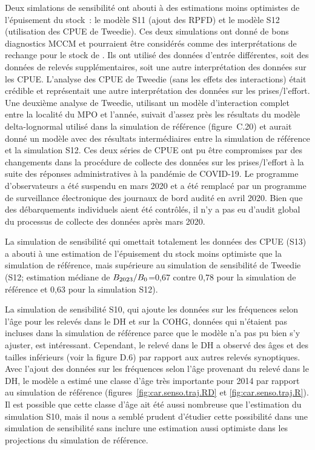 \documentclass[11pt]{book}
\begin{document}
Deux simlations de sensibilit\'{e} ont abouti \`{a} des estimations moins optimistes de l'\'{e}puisement du stock~: le mod\`{e}le S11 (ajout des RPFD) et le mod\`{e}le S12 (utilisation des CPUE de Tweedie). Ces deux simulations ont donn\'{e} de bons diagnostics MCCM et pourraient \^{e}tre consid\'{e}r\'{e}s comme des interpr\'{e}tations de rechange pour le stock de \SPC{}.
Ils ont utilis\'{e} des donn\'{e}es d'entr\'{e}e diff\'{e}rentes, soit des donn\'{e}es de relev\'{e}s suppl\'{e}mentaires, soit une autre interpr\'{e}tation des donn\'{e}es sur les CPUE.
L'analyse des CPUE de Tweedie (sans les effets des interactions) \'{e}tait cr\'{e}dible et repr\'{e}sentait une autre interpr\'{e}tation des donn\'{e}es sur les prises/l'effort. Une deuxi\`{e}me analyse de Tweedie, utilisant un mod\`{e}le d'interaction complet entre la localit\'{e} du MPO et l'ann\'{e}e, suivait d'assez pr\`{e}s les r\'{e}sultats du mod\`{e}le delta-lognormal utilis\'{e} dans la simulation de r\'{e}f\'{e}rence (figure~C.20) et aurait donn\'{e} un mod\`{e}le avec des r\'{e}sultats interm\'{e}diaires entre la simulation de r\'{e}f\'{e}rence et la simulation S12.
Ces deux s\'{e}ries de CPUE ont pu \^{e}tre compromises par des changements dans la proc\'{e}dure de collecte des donn\'{e}es sur les prises/l'effort \`{a} la suite des r\'{e}ponses administratives \`{a} la pand\'{e}mie de COVID-19.
Le programme d'observateurs a \'{e}t\'{e} suspendu en mars 2020 et a \'{e}t\'{e} remplac\'{e} par un programme de surveillance \'{e}lectronique des journaux de bord audit\'{e} en avril 2020. Bien que des d\'{e}barquements individuels aient \'{e}t\'{e} contr\^{o}l\'{e}s, il n'y a pas eu d'audit global du processus de collecte des donn\'{e}es apr\`{e}s mars 2020.

La simulation de sensibilit\'{e} qui omettait totalement les donn\'{e}es des CPUE (S13) a abouti \`{a} une estimation de l'\'{e}puisement du stock moins optimiste que la simulation de r\'{e}f\'{e}rence, mais sup\'{e}rieure au simulation de sensibilit\'{e} de Tweedie (S12; estimation m\'{e}diane de $B_{2023}/B_0$=0,67 contre 0,78 pour la simulation de r\'{e}f\'{e}rence et 0,63 pour la simulation S12).

La simulation de sensibilit\'{e} S10, qui ajoute les donn\'{e}es sur les fr\'{e}quences selon l'\^{a}ge pour les relev\'{e}s dans le DH et sur la COHG, donn\'{e}es qui n'\'{e}taient pas incluses dans la simulation de r\'{e}f\'{e}rence parce que le mod\`{e}le n'a pas pu bien s'y ajuster, est int\'{e}ressant.
Cependant, le relev\'{e} dans le DH a observ\'{e} des \^{a}ges et des tailles inf\'{e}rieurs (voir la figure D.6) par rapport aux autres relev\'{e}s synoptiques.
Avec l'ajout des donn\'{e}es sur les fr\'{e}quences selon l'\^{a}ge provenant du relev\'{e} dans le DH, le mod\`{e}le a estim\'{e} une classe d'\^{a}ge tr\`{e}s importante pour 2014 par rapport au simulation de r\'{e}f\'{e}rence (figures~\ref{fig:car.senso.traj.RD} et \ref{fig:car.senso.traj.R}).
Il est possible que cette classe d'\^{a}ge ait \'{e}t\'{e} aussi nombreuse que l'estimation du simulation S10, mais il nous a sembl\'{e} prudent d'\'{e}tudier cette possibilit\'{e} dans une simulation de sensibilit\'{e} sans inclure une estimation aussi optimiste dans les projections du simulation de r\'{e}f\'{e}rence.
\end{document}

